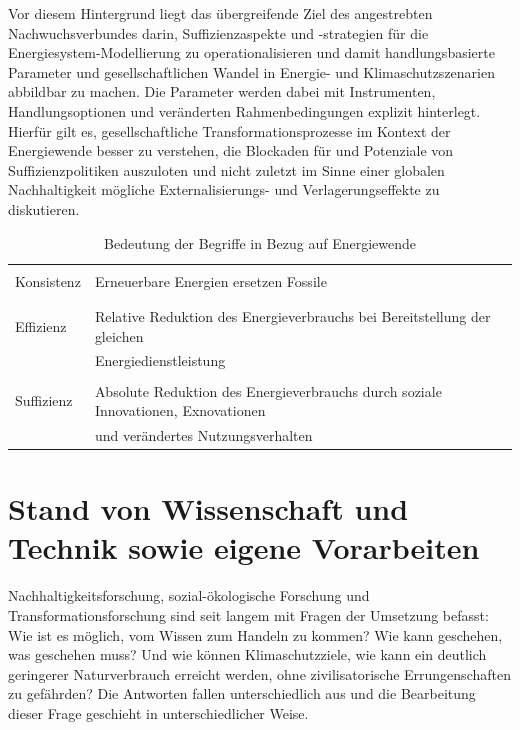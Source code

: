 \documentclass[a4paper,11pt,twoside]{scrartcl}
\begin{document}
Vor diesem Hintergrund liegt das übergreifende Ziel des angestrebten Nachwuchsverbundes darin, Suffizienzaspekte und -strategien für die Energiesystem-Modellierung zu operationalisieren und damit handlungsbasierte Parameter und gesellschaftlichen Wandel in Energie- und Klimaschutzszenarien abbildbar zu machen. Die Parameter werden dabei mit Instrumenten, Handlungsoptionen und veränderten Rahmenbedingungen explizit hinterlegt. Hierfür gilt es, gesellschaftliche Transformationsprozesse im Kontext der Energiewende besser zu verstehen, die Blockaden für und Potenziale von Suffizienzpolitiken auszuloten und nicht zuletzt im Sinne einer globalen Nachhaltigkeit mögliche Externalisierungs- und Verlagerungseffekte zu diskutieren. 

\begin{table}[h]
\begin{center}
\small
  \caption{Bedeutung der Begriffe in Bezug auf Energiewende}
\begin{tabular}[h]{|l | l |}
\hline
&\\
Konsistenz & Erneuerbare Energien ersetzen Fossile\\
&\\
\hline
&\\
 Effizienz & Relative Reduktion des Energieverbrauchs bei Bereitstellung der gleichen\\
 & Energiedienstleistung\\
 \hline
 &\\
Suffizienz & Absolute Reduktion des Energieverbrauchs durch soziale Innovationen, Exnovationen\\
& und verändertes Nutzungsverhalten \\
 \hline
 \end{tabular}
 \label{tab:koefsu}
\end{center}
\end{table}

\section{Stand von Wissenschaft und Technik sowie eigene Vorarbeiten}
\label{sec:2}
Nachhaltigkeitsforschung, sozial-ökologische Forschung und Transformationsforschung sind seit langem mit Fragen der Umsetzung befasst: Wie ist es möglich, vom Wissen zum Handeln zu kommen? \cite{BMBF2008} Wie kann geschehen, was geschehen muss? \cite{Linz2000} Und wie können Klimaschutzziele, wie kann ein deutlich geringerer Naturverbrauch erreicht werden, ohne zivilisatorische Errungenschaften zu gefährden? \cite{Sommer2016,WGBU2011} Die Antworten fallen unterschiedlich aus und die Bearbeitung dieser Frage geschieht in unterschiedlicher Weise.
\end{document}
